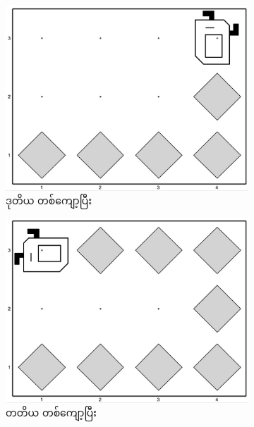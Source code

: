 \begin{figure}[tbh!]
\begin{subfigure}[t]{{\figpctw}\textwidth}
        \includegraphics[scale=\figscale]{images/ch02/beeper_fence/2nd_iter.jpg}
        \caption{ဒုတိယ တစ်ကျော့ပြီး}    
    \end{subfigure}
    \begin{subfigure}[t]{{\figpctw}\textwidth}
        \includegraphics[scale=\figscale]{images/ch02/beeper_fence/3rd_iter.jpg}
        \caption{တတိယ တစ်ကျော့ပြီး}    
    \end{subfigure}
    \begin{subfigure}[t]{{\figpctw}\textwidth}

\end{subfigure}
\end{figure}
